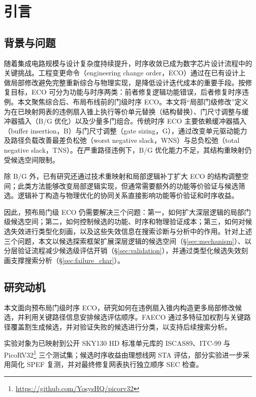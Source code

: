 \documentclass[twocolumn,10pt,fontset=windows]{ctexart}
\begin{document}
\section{引言}

\subsection{背景与问题}
随着集成电路规模与设计复杂度持续提升，时序收敛已成为数字芯片设计流程中的关键挑战。工程变更命令（engineering change order，ECO）通过在已有设计上做局部修改避免完整重新综合与物理实现，是降低设计迭代成本的重要手段。按修复目标，ECO 可分为功能与时序两类：前者修复逻辑功能错误，后者修复时序违例。本文聚焦综合后、布局布线前的门级时序 ECO。本文将“局部门级修改”定义为在已映射网表的违例扇入锥上执行等价单元替换（结构替换）、门尺寸调整与缓冲器插入（B/G 优化）以及少量多门组合。传统时序 ECO 主要依赖缓冲器插入（buffer insertion，B）与门尺寸调整（gate sizing，G），通过改变单元驱动能力及路径负载改善最差负松弛（worst negative slack，WNS）与总负松弛（total negative slack，TNS）。在严重路径违例下，B/G 优化能力不足，其结构重映射仍受候选空间限制\cite{ho2010eco,liu2021rlsizer,chen2024aito}。

除 B/G 外，已有研究还通过技术重映射和局部逻辑补丁扩大 ECO 的结构调整空间；此类方法能够改变局部逻辑实现，但通常需要额外的功能等价验证与候选筛选。逻辑补丁构造与物理优化的协同关系直接影响功能等价验证和时序收益。

因此，预布局门级 ECO 仍需要解决三个问题：第一，如何扩大深层逻辑的局部门级候选空间；第二，如何控制候选的功能、时序和物理验证成本；第三，如何对候选失效进行类型化刻画，以及这些失效信息在搜索诊断与分析中的作用。针对上述三个问题，本文以候选探索框架扩展深层逻辑的候选空间（\S\ref{sec:mechanism}）、以分层验证流程减少候选级评估开销（\S\ref{sec:validation}），并通过类型化候选失效刻画支撑搜索分析（\S\ref{sec:failure_char}）。
\subsection{研究动机}
本文面向预布局门级时序 ECO，研究如何在违例扇入锥内构造更多局部修改候选，并利用关键路径信息安排候选评估顺序。FAECO 通过多特征加权割与关键路径覆盖割生成候选，并对验证失败的候选进行分类，以支持后续搜索分析。

实验对象为已映射到公开 SKY130 HD 标准单元库的 ISCAS89\cite{iscas89}、ITC-99\cite{itc99} 与 PicoRV32\footnote{\url{https://github.com/YosysHQ/picorv32}} 三个测试集；候选时序收益由理想线网 STA 评估，部分实验进一步采用简化 SPEF 复测，并对最终修复网表执行独立顺序 SEC 检查。
\end{document}
